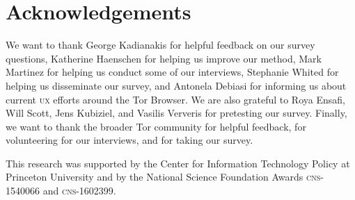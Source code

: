 \section*{Acknowledgements}

We want to thank George Kadianakis for helpful feedback on our survey questions,
Katherine Haenschen for helping us improve our method, Mark Martinez for helping
us conduct some of our interviews, Stephanie Whited for helping us disseminate
our survey, and Antonela Debiasi for informing us about current \textsc{ux}
efforts around the Tor Browser.  We are also grateful to Roya Ensafi, Will
Scott, Jens Kubiziel, and Vasilis Ververis for pretesting our survey.  Finally,
we want to thank the broader Tor community for helpful feedback, for
volunteering for our interviews, and for taking our survey.

This research was supported by the Center for Information Technology Policy at
Princeton University and by the National Science Foundation Awards
\textsc{cns}-1540066 and \textsc{cns}-1602399.
